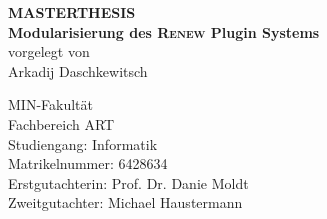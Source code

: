 \usepackage{colortbl}	
\usepackage{xcolor}
\usepackage[T1]{fontenc}
\usepackage{rotating}
\usepackage{hyphenat}
\usepackage{hyphenat}


% 
\begin{titlepage}


\vspace*{2cm}
\Large
\begin{center}
              {\color{uhhred}\textbf{{MASTERTHESIS}}}
\vspace*{2.0cm}\\
{\LARGE \textbf{Modularisierung des \textsc{Renew} Plugin Systems}}
\vspace*{2.0cm}\\
vorgelegt von
\vspace*{0.4cm}\\
Arkadij Daschkewitsch
\end{center}
\vspace*{3.7cm}

\noindent
MIN-Fakultät \vspace*{0.25cm} \\
Fachbereich ART \vspace*{0.25cm} \\
Studiengang: Informatik \vspace*{0.25cm} \\
Matrikelnummer: 6428634\vspace*{0.5cm} \\
Erstgutachterin: Prof. Dr.  Danie Moldt \vspace*{0.25cm} \\
Zweitgutachter: Michael Haustermann               %
\end{titlepage}
